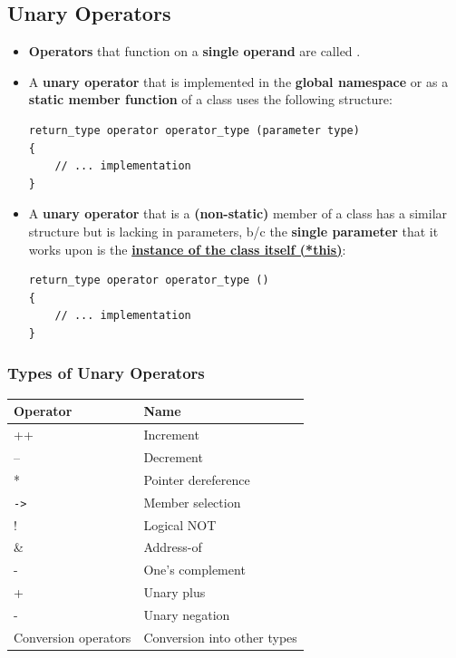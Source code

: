\documentclass[10pt]{article}
\newcommand{\vocab}[1]{\fbox{\textbf{\textit{#1}}}}
\begin{document}
\subsection{Unary Operators}
\begin{itemize}
	\item \textbf{Operators} that function on a \textbf{single operand} are called \vocab{unary operaetors}.

	\item A \textbf{unary operator} that is implemented in the \textbf{global namespace} or as a \textbf{static member function} of a class uses the following structure:
	\begin{verbatim}
return_type operator operator_type (parameter type)
{
	// ... implementation
}
	\end{verbatim}

\item A \textbf{unary operator} that is a \textbf{(non-static)} member of a class has a similar structure but is lacking in parameters, b/c the \textbf{single parameter} that it works upon is the \underline{\textbf{instance of the class itself (*this)}}:

	\begin{verbatim}
return_type operator operator_type ()
{
	// ... implementation
}
	\end{verbatim}
\end{itemize}

\newpage

\subsubsection{Types of Unary Operators}
\begin{tabular}{|p{}|p{}|}
    \hline
    \textbf{Operator} & \textbf{Name} \\
    \hline
    ++ & Increment \\
    -- & Decrement \\
	* & Pointer dereference \\
	\verb|->| & Member selection \\
	! & Logical NOT \\
	\& & Address-of \\
	- & One's complement \\ 
	+ & Unary plus \\ 
	- & Unary negation \\ 
	Conversion operators & Conversion into other types \\
    \hline
\end{tabular}
\end{document}
